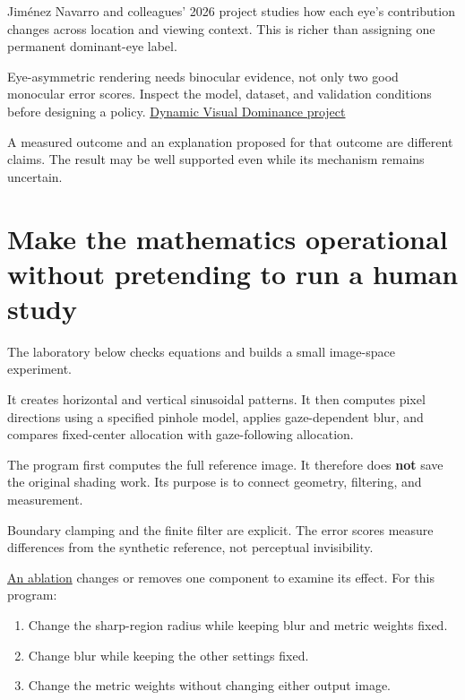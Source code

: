 Jiménez Navarro and colleagues' 2026 project studies how each eye's contribution changes across location and viewing context. This is richer than assigning one permanent dominant-eye label.

Eye-asymmetric rendering needs binocular evidence, not only two good monocular error scores. Inspect the model, dataset, and validation conditions before designing a policy. \href{https://dynamicvisualdominance.mpi-inf.mpg.de/}{Dynamic Visual Dominance project}

A measured outcome and an explanation proposed for that outcome are different claims. The result may be well supported even while its mechanism remains uncertain.

\section{Make the mathematics operational without pretending to run a human study}\label{04-visual-computing-ii-ch043-make-the-mathematics-operational-without-pretending-to-run-a-human-study}

The laboratory below checks equations and builds a small image-space experiment.

It creates horizontal and vertical sinusoidal patterns. It then computes pixel directions using a specified pinhole model, applies gaze-dependent blur, and compares fixed-center allocation with gaze-following allocation.

The program first computes the full reference image. It therefore does \textbf{not} save the original shading work. Its purpose is to connect geometry, filtering, and measurement.

Boundary clamping and the finite filter are explicit. The error scores measure differences from the synthetic reference, not perceptual invisibility.

\hyperref[appendix-65788587ef78]{An ablation} changes or removes one component to examine its effect. For this program:

\begin{enumerate}
\def\labelenumi{\arabic{enumi}.}
\tightlist
\item
  Change the sharp-region radius while keeping blur and metric weights fixed.
\item
  Change blur while keeping the other settings fixed.
\item
  Change the metric weights without changing either output image.
\end{enumerate}

